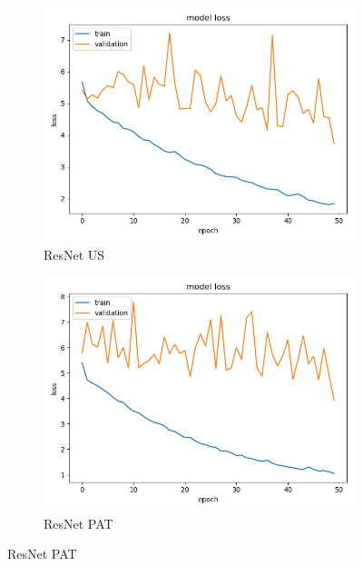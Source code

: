 \begin{figure}
\begin{subfigure}[b]{.45\linewidth}
\includegraphics[width=\linewidth]{Figs/resnet_us_loss.jpg}
\caption{ResNet US}
\end{subfigure}
\begin{subfigure}[b]{.45\linewidth}
\includegraphics[width=\linewidth]{Figs/resnet_pat_loss.jpg}
\caption{ResNet PAT}
\end{subfigure}


\end{figure}
